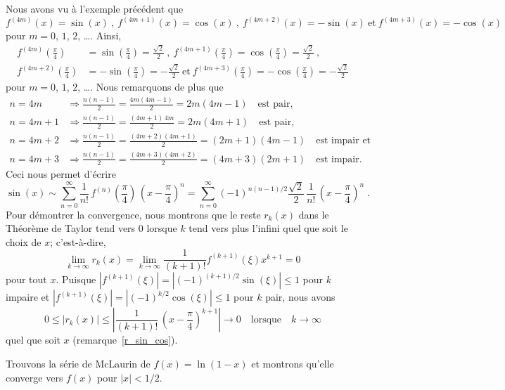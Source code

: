 {\begin{egg}
Nous avons vu à l'exemple précédent que
\[
f^{(4m)}(x) = \sin(x) \ , \ f^{(4m+1)}(x) = \cos(x) \ , \ 
f^{(4m+2)}(x) = -\sin(x) \ \text{et} \ f^{(4m+3)}(x) = -\cos(x)
\]
pour $m=0$, $1$, $2$, \ldots.  Ainsi,
\begin{align*}
f^{(4m)}\left(\frac{\pi}{4}\right) &= \sin\left(\frac{\pi}{4}\right) =
\frac{\sqrt{2}}{2} \ , \
f^{(4m+1)}\left(\frac{\pi}{4}\right) = \cos\left(\frac{\pi}{4}\right)
= \frac{\sqrt{2}}{2} \ , \\
f^{(4m+2)}\left(\frac{\pi}{4}\right) &= -\sin\left(\frac{\pi}{4}\right)
= -\frac{\sqrt{2}}{2}  \ \text{et} \ 
f^{(4m+3)}\left(\frac{\pi}{4}\right) = -\cos\left(\frac{\pi}{4}\right)
= -\frac{\sqrt{2}}{2}
\end{align*}
pour $m=0$, $1$, $2$, \ldots.  Nous remarquons de plus que
\begin{align*}
n=4m & \Rightarrow \frac{n(n-1)}{2} = \frac{4m(4m-1)}{2} = 2m(4m-1)
\quad \text{est pair},\\
n=4m+1 & \Rightarrow \frac{n(n-1)}{2} = \frac{(4m+1)\,4m}{2} =
2m(4m+1) \quad \text{est pair},\\
n=4m+2 & \Rightarrow \frac{n(n-1)}{2} = \frac{(4m+2)(4m+1)}{2} =
(2m+1)(4m-1) \quad \text{est impair et}\\
n=4m+3 & \Rightarrow \frac{n(n-1)}{2} = \frac{(4m+3)(4m+2)}{2} =
(4m+3)(2m+1) \quad \text{est impair}.
\end{align*}
Ceci nous permet d'écrire
\[
\sin(x) \sim \sum_{n=0}^\infty \frac{1}{n!} \,
f^{(n)}\left(\frac{\pi}{4}\right) \, \left(x-\frac{\pi}{4}\right)^n
= \sum_{n=0}^\infty (-1)^{n(n-1)/2} \frac{\sqrt{2}}{2} \,
\frac{1}{n!} \, \left(x-\frac{\pi}{4}\right)^n \; .
\]
Pour démontrer la convergence, nous montrons que le reste $r_k(x)$ dans le
Théorème de Taylor tend vers $0$ lorsque $k$ tend vers plus l'infini
quel que soit le choix de $x$; c'est-à-dire,
\[
\lim_{k\rightarrow \infty} r_k(x) =
\lim_{k\rightarrow \infty}
\frac{1}{(k+1)!} f^{(k+1)}(\xi) x^{k+1} = 0
\]
pour tout $x$.  Puisque
$\displaystyle \left| f^{(k+1)}(\xi) \right|
= \left| (-1)^{(k+1)/2} \sin(\xi) \right| \leq 1$ pour $k$ impaire et
$\displaystyle \left| f^{(k+1)}(\xi) \right|
= \left| (-1)^{k/2} \cos(\xi) \right| \leq 1$ pour $k$ pair, nous avons
\[
0 \leq \left| r_k(x) \right| \leq \left| \frac{1}{(k+1)!}\,
\left(x-\frac{\pi}{4}\right)^{k+1} \right|
\rightarrow 0 \quad \text{lorsque} \quad k \rightarrow \infty
\]
quel que soit $x$ (remarque~\ref{r_sin_cos}).
\end{egg}

\begin{egg}
Trouvons la série de McLaurin de $f(x)=\ln(1-x)$ et montrons
qu'elle converge vers $f(x)$ pour $|x|<1/2$.


\end{egg}}
